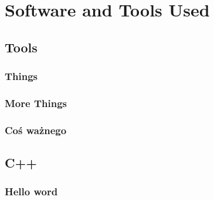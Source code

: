 \chapter{Software and Tools Used}
\label{Software}

\section{Tools}
\subsection{Things}
\subsection{More Things}
\subsection{Coś ważnego}
\section{C++}
\subsection{Hello word}


